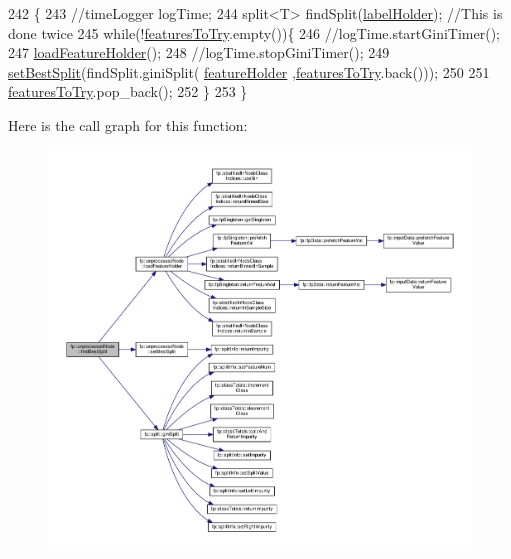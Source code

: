 \begin{DoxyCode}
242                                            \{
243                     \textcolor{comment}{//timeLogger logTime;}
244                     split<T> findSplit(\hyperlink{classfp_1_1unprocessedNode_a2aa2f9dcba0b0a859457ed22e147f698}{labelHolder}); \textcolor{comment}{//This is done twice}
245                     \textcolor{keywordflow}{while}(!\hyperlink{classfp_1_1unprocessedNode_ab625569c5339dfbe93b487765f530313}{featuresToTry}.empty())\{
246                     \textcolor{comment}{//logTime.startGiniTimer();}
247                         \hyperlink{classfp_1_1unprocessedNode_a8cedeb8c4c88345ff97f9afb89b3ccd0}{loadFeatureHolder}();
248                     \textcolor{comment}{//logTime.stopGiniTimer();}
249                         \hyperlink{classfp_1_1unprocessedNode_ae7ad0b6bf8142ea5d3d851e29b5b9aee}{setBestSplit}(findSplit.giniSplit(
      \hyperlink{classfp_1_1unprocessedNode_ac2a435f6f38c5c0d2b4ba4b721fd5eaa}{featureHolder} ,\hyperlink{classfp_1_1unprocessedNode_ab625569c5339dfbe93b487765f530313}{featuresToTry}.back()));
250     
251                         \hyperlink{classfp_1_1unprocessedNode_ab625569c5339dfbe93b487765f530313}{featuresToTry}.pop\_back();
252                     \}
253                 \}
\end{DoxyCode}
Here is the call graph for this function\+:
\nopagebreak
\begin{figure}[H]
\begin{center}
\leavevmode
\includegraphics[width=350pt]{classfp_1_1unprocessedNode_a5fea1583d2250e14470d92568b57e60c_cgraph}
\end{center}
\end{figure}
\mbox{\label{classfp_1_1unprocessedNode_ad4ffdb4f4b91d6d21f8954f3c80a3617}} 
